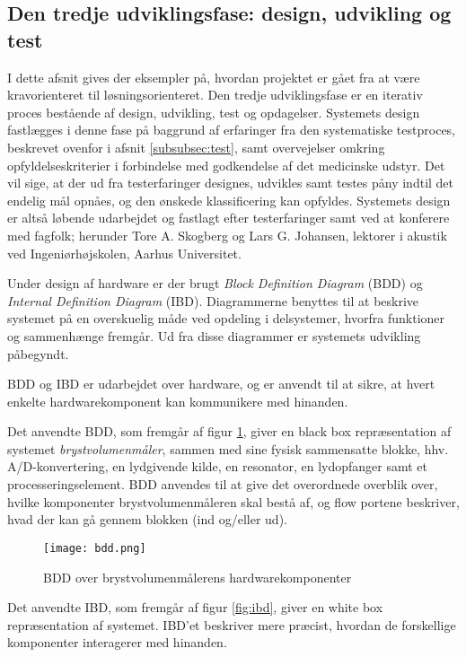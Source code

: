 \subsection{Den tredje udviklingsfase: design, udvikling og test} 
I dette afsnit gives der eksempler på, hvordan projektet er gået fra at være kravorienteret til løsningsorienteret.
Den tredje udviklingsfase er en iterativ proces bestående af design, udvikling, test og opdagelser. Systemets design fastlægges i denne fase på baggrund af erfaringer fra den systematiske testproces, beskrevet ovenfor i afsnit  \ref{subsubsec:test}, samt overvejelser omkring opfyldelseskriterier i forbindelse med godkendelse af det medicinske udstyr. Det vil sige, at der ud fra testerfaringer designes, udvikles samt testes påny indtil det endelig mål opnåes, og den ønskede klassificering kan opfyldes. Systemets design er altså løbende udarbejdet og fastlagt efter testerfaringer samt ved at konferere med fagfolk; herunder Tore A. Skogberg og Lars G. Johansen, lektorer i akustik ved Ingeniørhøjskolen, Aarhus Universitet.

Under design af hardware er der brugt \textit{Block Definition Diagram} (BDD) og \textit{Internal Definition Diagram} (IBD). Diagrammerne benyttes til at beskrive systemet på en overskuelig måde ved opdeling i delsystemer, hvorfra funktioner og sammenhænge fremgår. Ud fra disse diagrammer er systemets udvikling påbegyndt. 

BDD og IBD er udarbejdet over hardware, og er anvendt til at sikre, at hvert enkelte hardwarekomponent kan kommunikere med hinanden. 

Det anvendte BDD, som fremgår af figur \ref{fig:bdd}, giver en black box repræsentation af systemet \textit{brystvolumenmåler}, sammen med sine fysisk sammensatte blokke, hhv. A/D-konvertering, en lydgivende kilde, en resonator, en lydopfanger samt et processeringselement. BDD anvendes til at give det overordnede overblik over, hvilke komponenter brystvolumenmåleren skal bestå af, og flow portene beskriver, hvad der kan gå gennem blokken (ind og/eller ud). 
    
\begin{figure}[htb]
\centering
\texttt{[image: bdd.png]}
\caption{BDD over brystvolumenmålerens hardwarekomponenter}
\label{fig:bdd}
\end{figure}

Det anvendte IBD, som fremgår af figur \ref{fig:ibd}, giver en white box repræsentation af systemet. IBD'et beskriver mere præcist, hvordan de forskellige komponenter interagerer med hinanden. 

